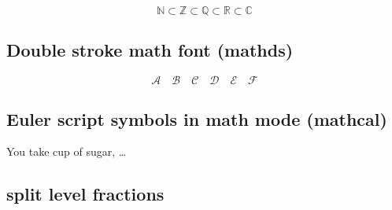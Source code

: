 %
\begin{filecontents*}{\democodefile}
\[
\mathds{N}\subset\mathds{Z}
          \subset\mathds{Q}
          \subset\mathds{R}
          \subset\mathds{C}
\]
\end{filecontents*}

\subsection{Double stroke math font (mathds)}

%
\begin{filecontents*}{\democodefile}
\[
  \mathcal{A} \quad \mathcal{B} \quad 
  \mathcal{C} \quad \mathcal{D} \quad 
  \mathcal{E} \quad \mathcal{F}
\]
\end{filecontents*}

\subsection{Euler script symbols in math mode (mathcal)}

%
\begin{filecontents*}{\democodefile}
You take  cup of sugar, \ldots
\end{filecontents*}

\subsection{split level fractions}

%

